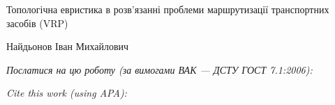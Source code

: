 \documentclass[a4paper,14pt]{extarticle}
\newcommand{\articleTitleUkr}{
Топологічна евристика в розв’язанні проблеми маршрутизації транспортних засобів (VRP)}
\newcommand{\authorFullNameUkr}{Найдьонов Іван Михайлович}
\begin{document}
\begin{center}\bf
\par\MakeUppercase\articleTitleUkr
\par\authorFullNameUkr
\end{center}

\par\bigskip\textit{Послатися на цю роботу (за вимогами ВАК --- ДСТУ ГОСТ 7.1:2006):}
\par{}
\par\bigskip\textit{Cite this work (using APA):}
\par{}

\end{document}
